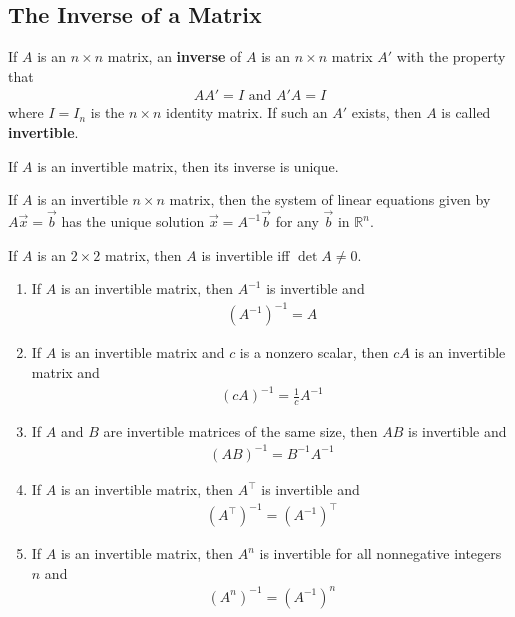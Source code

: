 \documentclass{article}
\begin{document}
\subsection{The Inverse of a Matrix}
\begin{definition}
    If $A$ is an $n\times n$ matrix, an \textbf{inverse} of $A$ is an $n\times n$ matrix $A'$ with the property that
    \begin{gather*}
        AA'=I\text{  and  } A'A = I
    \end{gather*}
    where $I = I_n$ is the $n\times n$ identity matrix. If such an $A'$ exists, then $A$ is called \textbf{invertible}.
\end{definition}
\begin{theorem}
    If $A$ is an invertible matrix, then its inverse is unique.
\end{theorem}
\begin{theorem}
    If $A$ is an invertible $n\times n$ matrix, then the system of linear equations given by $A\vec x = \vec b$ has the unique solution $\vec x = A^{-1}\vec b$ for any $\vec b$ in $\mathbb{R}^n$.
\end{theorem}
\begin{theorem}
    If $A$ is an $2\times 2$ matrix, then $A$ is invertible iff $\det A \not= 0$.
\end{theorem}
\begin{theorem}
    \begin{enumerate}
        \item If $A$ is an invertible matrix, then $A^{-1}$ is invertible and
              \begin{gather*}
                  (A^{-1})^{-1} = A
              \end{gather*}
        \item If $A$ is an invertible matrix and $c$ is a nonzero scalar, then $cA$ is an invertible matrix and \begin{gather*}
                  (cA)^{-1} = \frac{1}{c}A^{-1}
              \end{gather*}
        \item If $A$ and $B$ are invertible matrices of the same size, then $AB$ is invertible and \begin{gather*}
                  (AB)^{-1} = B^{-1} A^{-1}
              \end{gather*}
        \item If $A$ is an invertible matrix, then $A^\intercal$ is invertible and \begin{gather*}
                  (A^\intercal)^{-1}=(A^{-1})^\intercal
              \end{gather*}
        \item If $A$ is an invertible matrix, then $A^n$ is invertible for all nonnegative integers $n$ and \begin{gather*}
                  (A^n)^{-1} = (A^{-1})^n
              \end{gather*}
    \end{enumerate}
\end{theorem}
\end{document}
